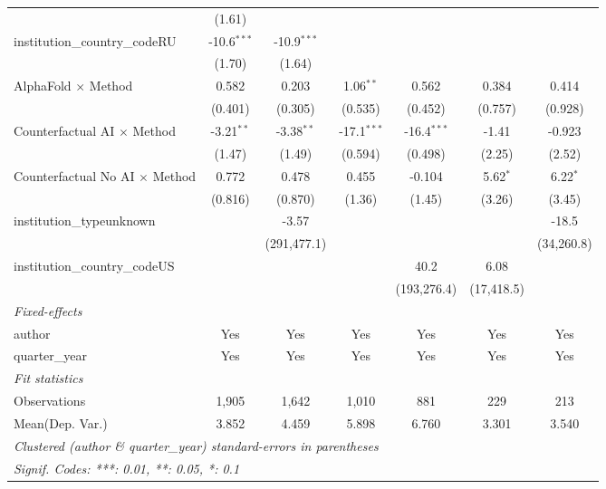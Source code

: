 \begin{tabular}{lcccccc}
                                         & (1.61)        &               &               &               &              &   \\   
   institution\_country\_codeRU          & -10.6$^{***}$ & -10.9$^{***}$ &               &               &              &   \\   
                                         & (1.70)        & (1.64)        &               &               &              &   \\   
   AlphaFold $\times$ Method             & 0.582         & 0.203         & 1.06$^{**}$   & 0.562         & 0.384        & 0.414\\   
                                         & (0.401)       & (0.305)       & (0.535)       & (0.452)       & (0.757)      & (0.928)\\   
   Counterfactual AI $\times$ Method     & -3.21$^{**}$  & -3.38$^{**}$  & -17.1$^{***}$ & -16.4$^{***}$ & -1.41        & -0.923\\   
                                         & (1.47)        & (1.49)        & (0.594)       & (0.498)       & (2.25)       & (2.52)\\   
   Counterfactual No AI $\times$ Method  & 0.772         & 0.478         & 0.455         & -0.104        & 5.62$^{*}$   & 6.22$^{*}$\\   
                                         & (0.816)       & (0.870)       & (1.36)        & (1.45)        & (3.26)       & (3.45)\\   
   institution\_typeunknown              &               & -3.57         &               &               &              & -18.5\\   
                                         &               & (291,477.1)   &               &               &              & (34,260.8)\\   
   institution\_country\_codeUS          &               &               &               & 40.2          & 6.08         &   \\   
                                         &               &               &               & (193,276.4)   & (17,418.5)   &   \\   
   \midrule
   \emph{Fixed-effects}\\
   author                                & Yes           & Yes           & Yes           & Yes           & Yes          & Yes\\  
   quarter\_year                         & Yes           & Yes           & Yes           & Yes           & Yes          & Yes\\  
   \midrule
   \emph{Fit statistics}\\
   Observations                          & 1,905         & 1,642         & 1,010         & 881           & 229          & 213\\  
Mean(Dep. Var.) & 3.852 & 4.459 & 5.898 & 6.760 & 3.301 & 3.540 \\
   \midrule \midrule
   \multicolumn{7}{l}{\emph{Clustered (author \& quarter\_year) standard-errors in parentheses}}\\
   \multicolumn{7}{l}{\emph{Signif. Codes: ***: 0.01, **: 0.05, *: 0.1}}\\
\end{tabular}
\par\endgroup
